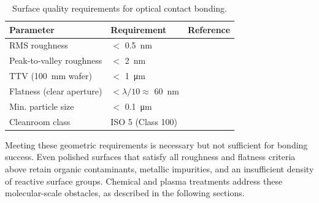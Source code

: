 \begin{table}[h]
\centering
\caption{Surface quality requirements for optical contact bonding.}
\label{tab:surface_requirements}
\begin{tabular}{lll}
\hline
\textbf{Parameter} & \textbf{Requirement} & \textbf{Reference} \\
\hline
RMS roughness & $<$ \SI{0.5}{\nano\meter} & \cite{gosele2006} \\
Peak-to-valley roughness & $<$ \SI{2}{\nano\meter} & \cite{gosele2006} \\
TTV (\SI{100}{\milli\meter} wafer) & $<$ \SI{1}{\micro\meter} & \cite{gosele2006} \\
Flatness (clear aperture) & $< \lambda/10 \approx$ \SI{60}{\nano\meter} & \cite{kalk2014} \\
Min. particle size & $<$ \SI{0.1}{\micro\meter} & \cite{du2022} \\
Cleanroom class & ISO 5 (Class 100) & \cite{du2022} \\
\hline
\end{tabular}
\end{table}

Meeting these geometric requirements is necessary but not sufficient for 
bonding success. Even polished surfaces that satisfy all roughness and 
flatness criteria above retain organic contaminants, metallic impurities, 
and an insufficient density of reactive surface groups. Chemical and plasma treatments 
address these molecular-scale obstacles, as described in the following 
sections.